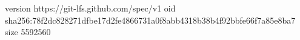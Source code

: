 version https://git-lfs.github.com/spec/v1
oid sha256:78f2dc828271dfbe17d2fe4866731a0f8abb4318b38b4f92bbfe66f7a85e8ba7
size 5592560
